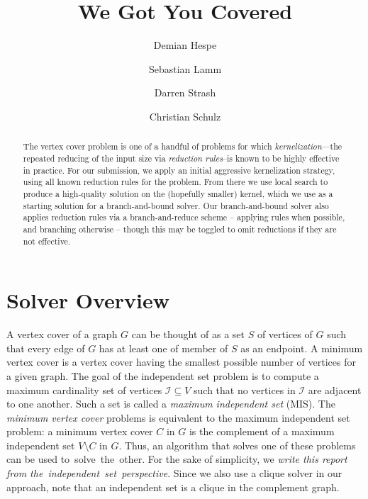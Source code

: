 \documentclass[a4paper,UKenglish]{lipics-v2016}
\newcommand{\mytitle}{We Got You Covered}
\begin{document}
\title{\mytitle}
\author[1]{Demian Hespe}
\author[2]{Sebastian Lamm}
\author[3]{Darren Strash}
\author[4]{Christian Schulz}


\date{}


\Copyright{}
\maketitle
\begin{abstract}
The vertex cover problem is one of a handful of problems for which \emph{kernelization}---the repeated reducing of the input size via \emph{reduction rules}--is known to be highly effective in practice. For our submission, we apply an initial aggressive kernelization strategy, using all known reduction rules for the problem. From there we use local search to produce a high-quality solution on the (hopefully smaller) kernel, which we use as a starting solution for a branch-and-bound solver. Our branch-and-bound solver also applies reduction rules via a branch-and-reduce scheme -- applying rules when possible, and branching otherwise -- though this may be toggled to omit reductions if they are not effective.\end{abstract}
\section{Solver Overview}

A vertex cover of a graph $G$ can be thought of as a set $S$ of vertices of $G$ such that every edge of $G$ has at least one of member of $S$ as an endpoint.
A minimum vertex cover is a vertex cover having the smallest possible number of vertices for a given graph. 
The goal of the independent set problem is to compute a maximum cardinality set of vertices $\mathcal{I}\subseteq V$ such that no vertices in $\mathcal{I}$ are adjacent to one another. Such a set is called a \emph{maximum independent set} (MIS).
The \emph{minimum vertex cover} problems is 
equivalent to the maximum independent set problem: a
minimum vertex cover $C$ in $G$ is the complement of a maximum independent set $V\setminus C$ in $G$. Thus, an algorithm that solves one of these problems can be used to~solve~the~other.
For the sake of simplicity, we \emph{write this report from the~independent~set~perspective}. 
Since we also use a clique solver in our approach, note that an independent set is a clique in the complement graph.
\end{document}
